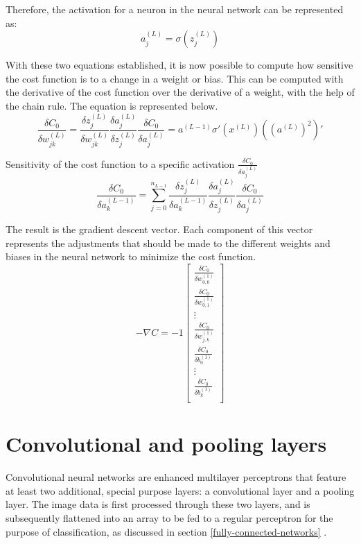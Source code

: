 \documentclass[12pt,a4paper,notitlepage]{article}
\begin{document}
Therefore, the activation for a neuron in the neural network can be represented as:
\begin{displaymath}
	a_j^{(L)} = \sigma\left(z_j^{(L)}\right)
\end{displaymath}

With these two equations established, it is now possible to compute how sensitive the cost function is to a change in a weight or bias. This can be computed with the derivative of the cost function over the derivative of a weight, with the help of the chain rule. The equation is represented below.
\begin{displaymath}
	\frac{\delta C_0}{\delta w_{jk}^{(L)}} =
	\frac{\delta z_j^{(L)}}{\delta w_{jk}^{(L)}}
	\frac{\delta a_j^{(L)}}{\delta z_j^{(L)}}
	\frac{\delta C_0}{\delta a_j^{(L)}}
	= a^{(L-1)} \sigma\prime(x^{(L)})((a^{(L)})^2)\prime
\end{displaymath}

Sensitivity of the cost function to a specific activation \(\frac{\delta C_0}{\delta a_j^{(L)}}\)
\begin{displaymath}
	\frac{\delta C_0}{\delta a_{k}^{(L-1)}} = 
	\sum_{j=0}^{n_{L-1}}
	\frac{\delta z_j^{(L)}}{\delta a_{k}^{(L-1)}}
	\frac{\delta a_j^{(L)}}{\delta z_j^{(L)}}
	\frac{\delta C_0}{\delta a_j^{(L)}}
\end{displaymath}

The result is the gradient descent vector. Each component of this vector represents the adjustments that should be made to the different weights and biases in the neural network to minimize the cost function.
\begin{displaymath}
	-\nabla C =
	-1 \begin{bmatrix}
		\frac{\delta C_0}{\delta w_{0,0}^{(1)}}\\
		\frac{\delta C_0}{\delta w_{0,1}^{(1)}}\\
		\vdots\\
		\frac{\delta C_0}{\delta w_{j,k}^{(1)}}\\
		\frac{\delta C_0}{\delta b_{0}^{(1)}}\\
		\vdots\\
		\frac{\delta C_0}{\delta b_{k}^{(1)}}\\
	\end{bmatrix}
\end{displaymath}

\section{Convolutional and pooling layers}
Convolutional neural networks are enhanced multilayer perceptrons that feature at least two additional, special purpose layers: a convolutional layer and a pooling layer. The image data is first processed through these two layers, and is subsequently flattened into an array to be fed to a regular perceptron for the purpose of classification, as discussed in section \ref{fully-connected-networks} \cite{saha_comprehensive_2018}.
\end{document}
